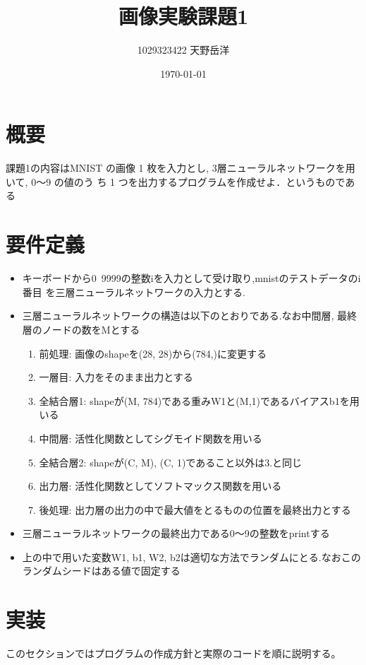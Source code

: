 \documentclass[a4paper,11pt]{jsarticle}
\begin{document}
\title{画像実験課題1}
\author{1029323422 天野岳洋}
\date{\today}
\maketitle
\clearpage

\section{概要}
課題1の内容はMNIST の画像 1 枚を入力とし, 3層ニューラルネットワークを用いて, 0～9 の値のう
ち 1 つを出力するプログラムを作成せよ．というものである


\section{要件定義}
\begin{itemize}
  \item キーボードから0~9999の整数iを入力として受け取り,mnistのテストデータのi番目
        を三層ニューラルネットワークの入力とする.
  \item 三層ニューラルネットワークの構造は以下のとおりである.なお中間層, 最終層のノードの数をMとする
        \begin{enumerate}
          \item 前処理: 画像のshapeを(28, 28)から(784,)に変更する
          \item 一層目: 入力をそのまま出力とする
          \item 全結合層1: shapeが(M, 784)である重みW1と(M,1)であるバイアスb1を用いる
          \item 中間層: 活性化関数としてシグモイド関数を用いる
          \item 全結合層2: shapeが(C, M), (C, 1)であること以外は3.と同じ
          \item 出力層: 活性化関数としてソフトマックス関数を用いる
          \item 後処理: 出力層の出力の中で最大値をとるものの位置を最終出力とする
        \end{enumerate}
  \item 三層ニューラルネットワークの最終出力である0～9の整数をprintする
  \item 上の中で用いた変数W1, b1, W2, b2は適切な方法でランダムにとる.なおこのランダムシードはある値で固定する
\end{itemize}

\section{実装}
このセクションではプログラムの作成方針と実際のコードを順に説明する。
\end{document}
